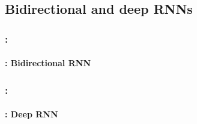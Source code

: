\documentclass[xcolor=table]{beamer}
\begin{document}
\subsection{Bidirectional and deep RNNs}


\begin{frame}
	\frametitle{\insertshortsubtitle: \insertsection}
	\framesubtitle{\insertsubsection: Bidirectional RNN}
	
	\begin{center}
	\end{center}
	
\end{frame}

\begin{frame}
	\frametitle{\insertshortsubtitle: \insertsection}
	\framesubtitle{\insertsubsection: Deep RNN}
	
	\begin{center}
	\end{center}
	
\end{frame}

%
%	

\end{document}
